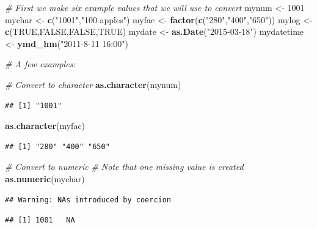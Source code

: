 \documentclass[]{book}
\newenvironment{Shaded}{\begin{snugshade}}{\end{snugshade}}
\newcommand{\CommentTok}[1]{\textcolor[rgb]{0.56,0.35,0.01}{\textit{#1}}}
\newcommand{\DecValTok}[1]{\textcolor[rgb]{0.00,0.00,0.81}{#1}}
\newcommand{\KeywordTok}[1]{\textcolor[rgb]{0.13,0.29,0.53}{\textbf{#1}}}
\newcommand{\NormalTok}[1]{#1}
\newcommand{\OtherTok}[1]{\textcolor[rgb]{0.56,0.35,0.01}{#1}}
\newcommand{\StringTok}[1]{\textcolor[rgb]{0.31,0.60,0.02}{#1}}
\begin{document}
\begin{Shaded}
\begin{Highlighting}[]
\CommentTok{# First we make six example values that we will use to convert}
\NormalTok{mynum <-}\StringTok{ }\DecValTok{1001}
\NormalTok{mychar <-}\StringTok{ }\KeywordTok{c}\NormalTok{(}\StringTok{"1001"}\NormalTok{,}\StringTok{"100 apples"}\NormalTok{)}
\NormalTok{myfac <-}\StringTok{ }\KeywordTok{factor}\NormalTok{(}\KeywordTok{c}\NormalTok{(}\StringTok{"280"}\NormalTok{,}\StringTok{"400"}\NormalTok{,}\StringTok{"650"}\NormalTok{))}
\NormalTok{mylog <-}\StringTok{ }\KeywordTok{c}\NormalTok{(}\OtherTok{TRUE}\NormalTok{,}\OtherTok{FALSE}\NormalTok{,}\OtherTok{FALSE}\NormalTok{,}\OtherTok{TRUE}\NormalTok{)}
\NormalTok{mydate <-}\StringTok{ }\KeywordTok{as.Date}\NormalTok{(}\StringTok{"2015-03-18"}\NormalTok{)}
\NormalTok{mydatetime <-}\StringTok{ }\KeywordTok{ymd_hm}\NormalTok{(}\StringTok{"2011-8-11 16:00"}\NormalTok{)}

\CommentTok{# A few examples:}

\CommentTok{# Convert to character}
\KeywordTok{as.character}\NormalTok{(mynum)}
\end{Highlighting}
\end{Shaded}

\begin{verbatim}
## [1] "1001"
\end{verbatim}

\begin{Shaded}
\begin{Highlighting}[]
\KeywordTok{as.character}\NormalTok{(myfac)}
\end{Highlighting}
\end{Shaded}

\begin{verbatim}
## [1] "280" "400" "650"
\end{verbatim}

\begin{Shaded}
\begin{Highlighting}[]
\CommentTok{# Convert to numeric}
\CommentTok{# Note that one missing value is created}
\KeywordTok{as.numeric}\NormalTok{(mychar)}
\end{Highlighting}
\end{Shaded}

\begin{verbatim}
## Warning: NAs introduced by coercion
\end{verbatim}

\begin{verbatim}
## [1] 1001   NA
\end{verbatim}
\end{document}
